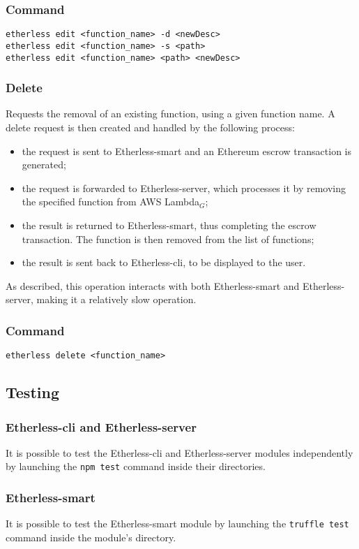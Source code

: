 	\subsubsection*{Command}
	\texttt{etherless edit <function\_name> -d <newDesc>} \\
	\texttt{etherless edit <function\_name> -s <path>} \\
	\texttt{etherless edit <function\_name> <path> <newDesc>} \\
	\subsubsection{Delete}
	Requests the removal of an existing function, using a given function name. A delete request is then created and handled by the following process:
	\begin{itemize}
		\item the request is sent to Etherless-smart and an Ethereum escrow transaction is generated;
		\item the request is forwarded to Etherless-server, which processes it by removing the specified function from AWS Lambda$_{G}$;
		\item the result is returned to Etherless-smart, thus completing the escrow transaction. The function is then removed from the list of functions;
		\item the result is sent back to Etherless-cli, to be displayed to the user.
	\end{itemize}
	As described, this operation interacts with both Etherless-smart and Etherless-server, making it a relatively slow operation.
	\subsubsection*{Command}
	\texttt{etherless delete <function\_name>}
\subsection{Testing}
\subsubsection{Etherless-cli and Etherless-server}
It is possible to test the Etherless-cli and Etherless-server modules independently by launching the \texttt{npm test} command inside their directories.
\subsubsection{Etherless-smart}
It is possible to test the Etherless-smart module by launching the \texttt{truffle test} command inside the module's directory.
